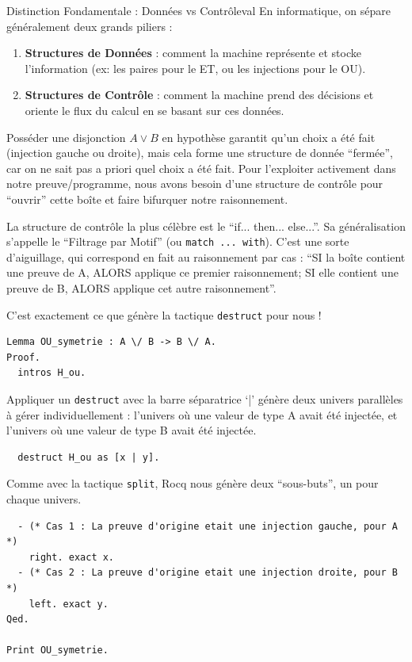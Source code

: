 \documentclass[11pt,a4paper]{article}
\begin{document}
\begin{remarque}{Distinction Fondamentale : Données vs Contrôle}{val}
  En informatique, on sépare généralement deux grands piliers :
  \begin{enumerate}
    \item \textbf{Structures de Données} : comment la machine représente et stocke l'information (ex: les paires pour le ET, ou les injections pour le OU).
    \item \textbf{Structures de Contrôle} : comment la machine prend des décisions et oriente le flux du calcul en se basant sur ces données.
  \end{enumerate}

  Posséder une disjonction $A \lor B$ en hypothèse garantit qu'un choix a été fait (injection gauche ou droite), mais cela forme une structure de donnée ``fermée'', car on ne sait pas a priori quel choix a été fait. Pour l'exploiter activement dans notre preuve/programme, nous avons besoin d'une structure de contrôle pour ``ouvrir'' cette boîte et faire bifurquer notre raisonnement.

  La structure de contrôle la plus célèbre est le ``if... then... else...''. Sa généralisation s'appelle le ``Filtrage par Motif'' (ou \texttt{match ... with}). C'est une sorte d'aiguillage, qui correspond en fait au raisonnement par cas : ``SI la boîte contient une preuve de A, ALORS applique ce premier raisonnement; SI elle contient une preuve de B, ALORS applique cet autre raisonnement''.

  C'est exactement ce que génère la tactique \texttt{destruct} pour nous !
\end{remarque}

\begin{lstlisting}
Lemma OU_symetrie : A \/ B -> B \/ A.
Proof.
  intros H_ou.
\end{lstlisting}

Appliquer un \texttt{destruct} avec la barre séparatrice `|' génère deux univers parallèles à gérer individuellement : l'univers où une valeur de type A avait été injectée, et l'univers où une valeur de type B avait été injectée.

\begin{lstlisting}
  destruct H_ou as [x | y].
\end{lstlisting}

Comme avec la tactique \texttt{split}, Rocq nous génère deux ``sous-buts'', un pour chaque univers.

\begin{lstlisting}
  - (* Cas 1 : La preuve d'origine etait une injection gauche, pour A *)
    right. exact x.
  - (* Cas 2 : La preuve d'origine etait une injection droite, pour B *)
    left. exact y.
Qed.

Print OU_symetrie.
\end{lstlisting}
\end{document}
